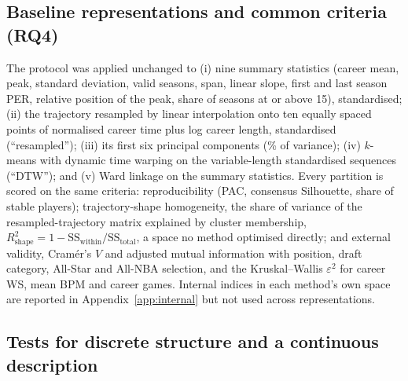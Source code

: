 \subsection{Baseline representations and common criteria (RQ4)}\label{sec:baselines}

The protocol was applied unchanged to (i) nine summary statistics (career mean, peak, standard deviation, valid seasons, span, linear slope, first and last season PER, relative position of the peak, share of seasons at or above 15), standardised; (ii) the trajectory resampled by linear interpolation onto ten equally spaced points of normalised career time plus log career length, standardised (``resampled''); (iii) its first six principal components (\pcaVar\% of variance); (iv) $k$-means with dynamic time warping \citep{sakoe1978,petitjean2011,tavenard2020} on the variable-length standardised sequences (``DTW''); and (v) Ward linkage on the summary statistics. Every partition is scored on the same criteria: reproducibility (PAC, consensus Silhouette, share of stable players); trajectory-shape homogeneity, the share of variance of the resampled-trajectory matrix explained by cluster membership, $R^2_{\mathrm{shape}}=1-\mathrm{SS}_{\mathrm{within}}/\mathrm{SS}_{\mathrm{total}}$, a space no method optimised directly; and external validity, Cram\'er's $V$ and adjusted mutual information \citep{vinh2010} with position, draft category, All-Star and All-NBA selection, and the Kruskal--Wallis $\varepsilon^2$ \citep{kruskal1952,tomczak2014} for career WS, mean BPM and career games. Internal indices in each method's own space are reported in Appendix~\ref{app:internal} but not used across representations.

\subsection{Tests for discrete structure and a continuous description}\label{sec:structure_methods}

